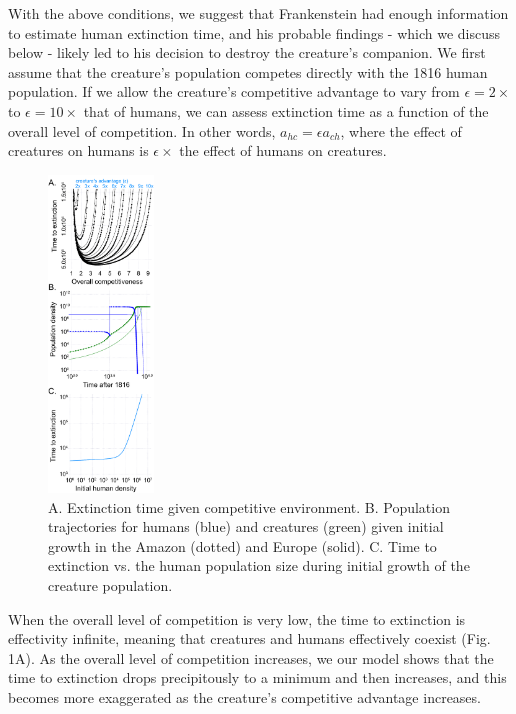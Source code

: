 \documentclass{article}[10pt]
\begin{document}
With the above conditions, we suggest that Frankenstein had enough information to estimate human extinction time, and his probable findings - which we discuss below - likely led to his decision to destroy the creature's companion.
We first assume that the creature's population competes directly with the 1816 human population.
If we allow the creature's competitive advantage to vary from $\epsilon=2\times$ to $\epsilon=10\times$ that of humans, we can assess extinction time as a function of the overall level of competition.
In other words, $a_{hc} = \epsilon a_{ch}$, where the effect of creatures on humans is $\epsilon \times$ the effect of humans on creatures.
\begin{figure}
\singlespacing
  \vspace{-35pt}
  \begin{center}
    \includegraphics[width=0.25\textwidth]{fig_combined.pdf}
  \end{center}
  \vspace{-15pt}
  \caption{\footnotesize 
  A. Extinction time given competitive environment.
  B. Population trajectories for humans (blue) and creatures (green) given initial growth in the Amazon (dotted) and Europe (solid).
  C. Time to extinction vs. the human population size during initial growth of the creature population.
  }
  \vspace{2pt}
    \label{fig}
\end{figure}
When the overall level of competition is very low, the time to extinction is effectivity infinite, meaning that creatures and humans effectively coexist (Fig. 1A).
As the overall level of competition increases, we our model shows that the time to extinction drops precipitously to a minimum and then increases, and this becomes more exaggerated as the creature's competitive advantage increases.
\end{document}
